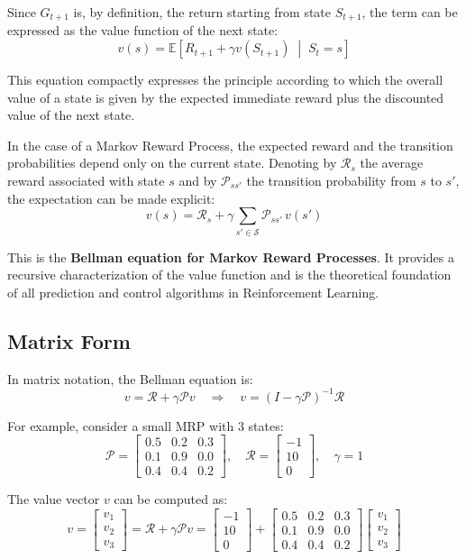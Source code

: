 Since $G_{t+1}$ is, by definition, the return starting from state $S_{t+1}$, the term can be expressed as the value function of the next state:
\[
v(s)
=
\mathbb{E}
\left[
R_{t+1}
+ \gamma v(S_{t+1})
\;\middle|\;
S_t = s
\right]
\]

This equation compactly expresses the principle according to which the overall value of a state is given by the expected immediate reward plus the discounted value of the next state.

In the case of a Markov Reward Process, the expected reward and the transition probabilities depend only on the current state. Denoting by $\mathcal{R}_s$ the average reward associated with state $s$ and by $\mathcal{P}_{ss'}$ the transition probability from $s$ to $s'$, the expectation can be made explicit:
\[
v(s)
=
\mathcal{R}_s
+
\gamma
\sum_{s' \in \mathcal{S}}
\mathcal{P}_{ss'} \, v(s')
\]

This is the \textbf{Bellman equation for Markov Reward Processes}. It provides a recursive characterization of the value function and is the theoretical foundation of all prediction and control algorithms in Reinforcement Learning.

\subsection{Matrix Form}


In matrix notation, the Bellman equation is:
\begin{equation}
v = \mathcal{R} + \gamma \mathcal{P} v \quad \Rightarrow \quad v = (I - \gamma \mathcal{P})^{-1} \mathcal{R}
\end{equation}

For example, consider a small MRP with 3 states:
\[
\mathcal{P} =
\begin{bmatrix}
0.5 & 0.2 & 0.3 \\
0.1 & 0.9 & 0.0 \\
0.4 & 0.4 & 0.2
\end{bmatrix}, \quad
\mathcal{R} =
\begin{bmatrix}
-1 \\
10 \\
0
\end{bmatrix}, \quad \gamma = 1
\]

The value vector $v$ can be computed as:
\[
v =
\begin{bmatrix}
v_1 \\
v_2 \\
v_3
\end{bmatrix} =
\mathcal{R} + \gamma \mathcal{P} v
=
\begin{bmatrix}
-1 \\
10 \\
0
\end{bmatrix} +
\begin{bmatrix}
0.5 & 0.2 & 0.3 \\
0.1 & 0.9 & 0.0 \\
0.4 & 0.4 & 0.2
\end{bmatrix}
\begin{bmatrix}
v_1 \\
v_2 \\
v_3
\end{bmatrix}
\]




